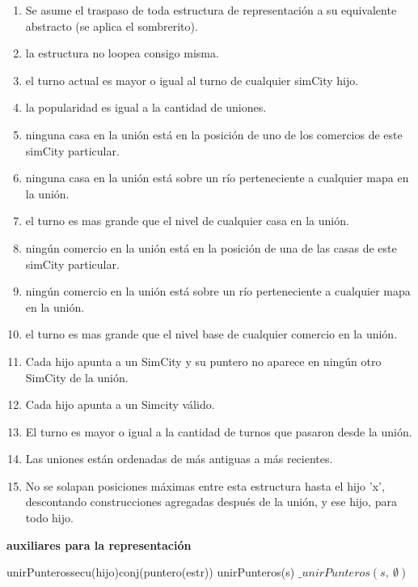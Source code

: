 \begin{footnotesize}
\begin{enumerate}
    \item Se asume el traspaso de toda estructura de representación a su equivalente abstracto 
    (se aplica el sombrerito).
    \item la estructura no loopea consigo misma.
    \item el turno actual es mayor o igual al turno de cualquier simCity hijo.
    \item la popularidad es igual a la cantidad de uniones.
    \item ninguna casa en la unión está en la posición de uno de los comercios de este simCity particular.
    \item ninguna casa en la unión está sobre un río perteneciente a cualquier mapa en la unión.
    \item el turno es mas grande que el nivel de cualquier casa en la unión.
    \item ningún comercio en la unión está en la posición de una de las casas de este simCity particular.
    \item ningún comercio en la unión está sobre un río perteneciente a cualquier mapa en la unión.
    \item el turno es mas grande que el nivel base de cualquier comercio en la unión.
    \item Cada hijo apunta a un SimCity y su puntero no aparece en ningún otro SimCity de la unión.
    \item Cada hijo apunta a un Simcity válido.
    \item El turno es mayor o igual a la cantidad de turnos que pasaron desde la unión.
    \item Las uniones están ordenadas de más antiguas a más recientes.
    \item No se solapan posiciones máximas entre esta estructura hasta el hijo 'x', descontando construcciones agregadas después de la unión, y ese hijo, para todo hijo.
\end{enumerate}
\end{footnotesize}


\noindent\textbf{\Large auxiliares para la representación}
\vspace*{2ex}%

\tadOperacion
{unirPunteros}{secu(hijo)}{conj(puntero(estr))}{}
\tadAxioma
{unirPunteros(s)}{ 
    $\_unirPunteros(s,\ \emptyset)$
}

